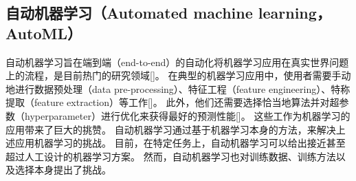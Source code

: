 


\subsection{自动机器学习（Automated machine learning，AutoML）}

自动机器学习旨在端到端（end-to-end）的自动化将机器学习应用在真实世界问题上的流程，是目前热门的研究领域[]。
在典型的机器学习应用中，使用者需要手动地进行数据预处理（data pre-processing）、特征工程（feature engineering）、特称提取（feature extraction）等工作[]。
此外，他们还需要选择恰当地算法并对超参数（hyperparameter）进行优化来获得最好的{\model}预测性能[]。
这些工作为机器学习的应用带来了巨大的挑赞。
自动机器学习通过基于机器学习本身的方法，来解决上述应用机器学习的挑战。
目前，在特定任务上，自动机器学习可以给出接近甚至超过人工设计的机器学习方案。
然而，自动机器学习也对训练数据、训练方法以及{\model}选择本身提出了挑战。



